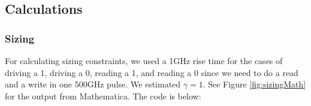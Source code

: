 \documentclass[a4paper]{article}
\begin{document}
\subsection{Calculations}
\label{sec:calculations}

\subsubsection{Sizing}
\label{subsec:sizing_calc}

For calculating sizing constraints, we used a 1GHz rise time for the cases of driving a 1, driving a 0, reading a 1, and reading a 0 since we need to do a read and a write in one 500GHz pulse. We estimated $\gamma = 1$. See Figure \ref{fig:sizingMath} for the output from Mathematica. The code is below:
\\\\\noindent
\end{document}
